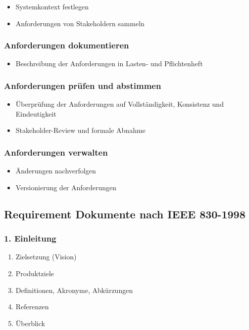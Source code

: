 \documentclass[11pt, a4paper]{article}
\begin{document}
\begin{itemize}
    \item Systemkontext festlegen
    \item Anforderungen von Stakeholdern sammeln
\end{itemize}

\subsubsection*{Anforderungen dokumentieren}

\begin{itemize}
    \item Beschreibung der Anforderungen in Lasten- und Pflichtenheft
\end{itemize}

\subsubsection*{Anforderungen prüfen und abstimmen}

\begin{itemize}
    \item Überprüfung der Anforderungen auf Vollständigkeit, Konsistenz und Eindeutigkeit
    \item Stakeholder-Review und formale Abnahme
\end{itemize}

\subsubsection*{Anforderungen verwalten}

\begin{itemize}
    \item Änderungen nachverfolgen
    \item Versionierung der Anforderungen
\end{itemize}

\newpage


\subsection{Requirement Dokumente nach IEEE 830-1998}

\subsubsection*{1. Einleitung}

\begin{enumerate}[label=(\alph*)]
    \item Zielsetzung (Vision)
    \item Produktziele
    \item Definitionen, Akronyme, Abkürzungen
    \item Referenzen
    \item Überblick
\end{enumerate}
\end{document}
